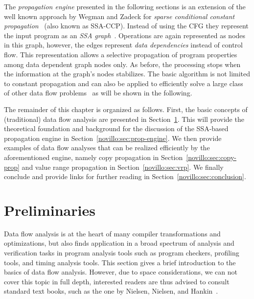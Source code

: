 The \emph{propagation engine} presented in the following sections is an
extension of the well known approach by Wegman and Zadeck for \emph{sparse
conditional constant propagation}~\cite{bib:wegman.ea-91} (also known as
SSA-CCP). Instead of using the CFG they represent the input program as an
\emph{SSA graph}~\cite{novillo:bib:CFRWZ91}. Operations are again represented as
nodes in this graph, however, the edges represent \emph{data dependencies}
instead of control flow. This representation allows a selective propagation of
program properties among data dependent graph nodes only. As before, the
processing stops when the information at the graph's nodes stabilizes. The basic
algorithm is not limited to constant propagation and can also be applied to
efficiently solve a large class of other data flow
problems~\cite{novillo:bib:N05} as will be shown in the following.

The remainder of this chapter is organized as follows. First, the basic concepts
of (traditional) data flow analysis are presented in
Section~\ref{novillo:sec:preliminaries}. This will provide the theoretical
foundation and background for the discussion of the SSA-based propagation
engine in Section~\ref{novillo:sec:prop-engine}. We then provide examples of
data flow analyses that can be realized efficiently by the aforementioned
engine, namely copy propagation in Section~\ref{novillo:sec:copy-prop} and value
range propagation in Section~\ref{novillo:sec:vrp}. We finally conclude and
provide links for further reading in Section~\ref{novillo:sec:conclusion}.

\section{Preliminaries}
\label{novillo:sec:preliminaries}

Data flow analysis is at the heart of many compiler transformations and
optimizations, but also finds application in a broad spectrum of analysis and
verification tasks in program analysis tools such as program checkers, profiling
tools, and timing analysis tools. This section gives a brief introduction to the
basics of data flow analysis. However, due to space considerations, we can not
cover this topic in full depth, interested readers are thus advised to consult
standard text books, such as the one by Nielsen, Nielsen, and
Hankin~\cite{novillo:bib:NNH99}.

